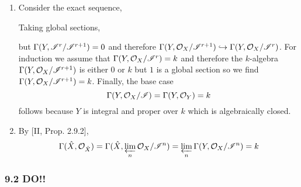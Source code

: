 \documentclass[12pt]{article}
\begin{document}
\begin{enumerate}
\item Consider the exact sequence,
\begin{center}
\end{center}
Taking global sections,
\begin{center}
\end{center}
but $\Gamma(Y, \mathscr{I}^r / \mathscr{I}^{r+1}) = 0$ and therefore $\Gamma(Y, \mathcal{O}_{X}/\mathscr{I}^{r+1}) \hookrightarrow \Gamma(Y, \mathcal{O}_{X} / \mathscr{I}^{r})$. For induction we assume that $\Gamma(Y, \mathcal{O}_{X} / \mathscr{I}^{r}) = k$ and therefore the $k$-algebra $\Gamma(Y, \mathcal{O}_{X}/\mathscr{I}^{r+1})$ is either $0$ or $k$ but $1$ is a global section so we find $\Gamma(Y, \mathcal{O}_{X}/\mathscr{I}^{r+1}) = k$. Finally, the base case 
\[ \Gamma(Y, \mathcal{O}_{X}/\mathscr{I}) = \Gamma(Y, \mathcal{O}_{Y}) = k \]
follows because $Y$ is integral and proper over $k$ which is algebraically closed.

\item By [II, Prop. 2.9.2],
\[ \Gamma(\hat{X}, \mathcal{O}_{\hat{X}}) = \Gamma(\hat{X}, \varprojlim_n \mathcal{O}_{X} / \mathscr{I}^n) = \varprojlim_n \Gamma(Y, \mathcal{O}_{X} / \mathscr{I}^n) = k \]
\end{enumerate}

\subsubsection{9.2 DO!!}
\end{document}
